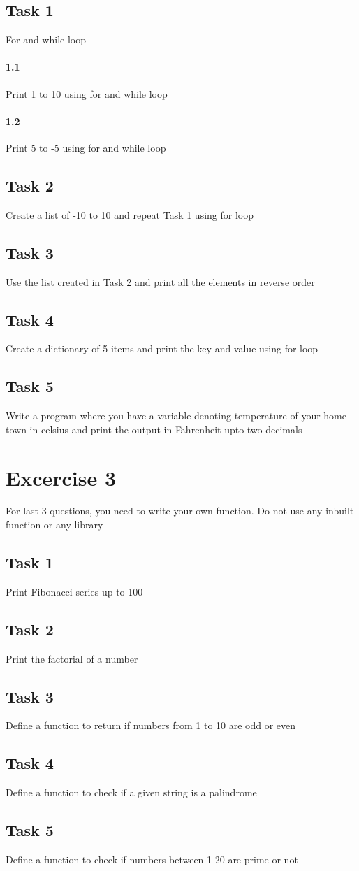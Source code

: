 \documentclass{article}
\begin{document}
    \subsection*{Task 1} For and while loop
    \paragraph{1.1}
    Print 1 to 10 using for and while loop
    \paragraph{1.2}
    Print 5 to -5 using for and while loop
    \subsection*{Task 2} Create a list of -10 to 10 and repeat Task 1 using for loop
    \subsection*{Task 3} Use the list created in Task 2 and print all the elements in reverse order
    \subsection*{Task 4} Create a dictionary of 5 items and print the key and value using for loop
    \subsection*{Task 5} 
    Write a program where you have a variable denoting temperature of your home town in celsius and print the output in Fahrenheit upto two decimals
    \\
    \section*{Excercise 3}
    For last 3 questions, you need to write your own function. Do not use any inbuilt function or any library
    \subsection*{Task 1} Print Fibonacci series up to 100
    \subsection*{Task 2} Print the factorial of a number
    \subsection*{Task 3} Define a function to return if numbers from 1 to 10 are odd or even
    \subsection*{Task 4} Define a function to check if a given string is a palindrome
    \subsection*{Task 5} Define a function to check if numbers between 1-20 are prime or not
    
    
\end{document}
